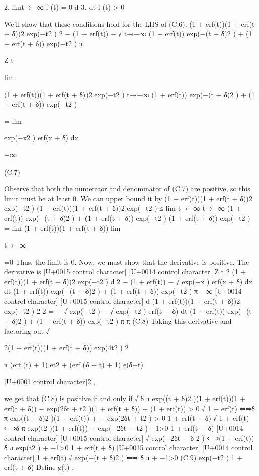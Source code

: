 \documentclass[10pt]{article}
\begin{document}
\begin{ReviewVerbatim}
2. limt→−∞ f (t) = 0
d
3. dt
f (t) > 0

We’ll show that these conditions hold for the LHS of (C.6).
(1 + erf(t))(1 + erf(t + δ))2 exp(−t2 )
2
− (1 + erf(t)) − √
t→−∞ (1 + erf(t)) exp(−(t + δ)2 ) + (1 + erf(t + δ)) exp(−t2 )
π

Z t

lim

(1 + erf(t))(1 + erf(t + δ))2 exp(−t2 )
t→−∞ (1 + erf(t)) exp(−(t + δ)2 ) + (1 + erf(t + δ)) exp(−t2 )

= lim

exp(−x2 ) erf(x + δ) dx

−∞

(C.7)

Observe that both the numerator and denominator of (C.7) are positive, so this limit must be at least 0.
We can upper bound it by
(1 + erf(t))(1 + erf(t + δ))2 exp(−t2 )
(1 + erf(t))(1 + erf(t + δ))2 exp(−t2 )
≤
lim
t→−∞
t→−∞ (1 + erf(t)) exp(−(t + δ)2 ) + (1 + erf(t + δ)) exp(−t2 )
(1 + erf(t + δ)) exp(−t2 )
= lim (1 + erf(t))(1 + erf(t + δ))
lim

t→−∞

=0
Thus, the limit is 0. Now, we must show that the derivative is positive. The derivative is
[U+0015 control character]
[U+0014 control character]
Z t
2
(1 + erf(t))(1 + erf(t + δ))2 exp(−t2 )
d
2
− (1 + erf(t)) − √
exp(−x ) erf(x + δ) dx
dt (1 + erf(t)) exp(−(t + δ)2 ) + (1 + erf(t + δ)) exp(−t2 )
π −∞
[U+0014 control character]
[U+0015 control character]
d
(1 + erf(t))(1 + erf(t + δ))2 exp(−t2 )
2
2
=
− √ exp(−t2 ) − √ exp(−t2 ) erf(t + δ)
dt (1 + erf(t)) exp(−(t + δ)2 ) + (1 + erf(t + δ)) exp(−t2 )
π
π
(C.8)
Taking this derivative and factoring out
√

2(1 + erf(t))(1 + erf(t + δ)) exp(4t2 )
2

π (erf (t) + 1) et2 + (erf (δ + t) + 1) e(δ+t)

[U+0001 control character]2 ,

we get that (C.8) is positive if and only if
√
δ π exp((t + δ)2 )(1 + erf(t))(1 + erf(t + δ)) − exp(2δt + t2 )(1 + erf(t + δ)) + (1 + erf(t)) > 0
√
1 + erf(t)
⇐⇒δ π exp((t + δ)2 )(1 + erf(t)) +
− exp(2δt + t2 ) > 0
1 + erf(t + δ)
√
1 + erf(t)
⇐⇒δ π exp(t2 )(1 + erf(t)) + exp(−2δt − t2 )
−1>0
1 + erf(t + δ)
[U+0014 control character]
[U+0015 control character]
√
exp(−2δt − δ 2 )
⇐⇒(1 + erf(t)) δ π exp(t2 ) +
−1>0
1 + erf(t + δ)
[U+0015 control character]
[U+0014 control character]
1 + erf(t) √
exp(−(t + δ)2 )
⇐⇒
δ
π
+
−1>0
(C.9)
exp(−t2 )
1 + erf(t + δ)
Define
g(t) ,


\end{ReviewVerbatim}
\end{document}
